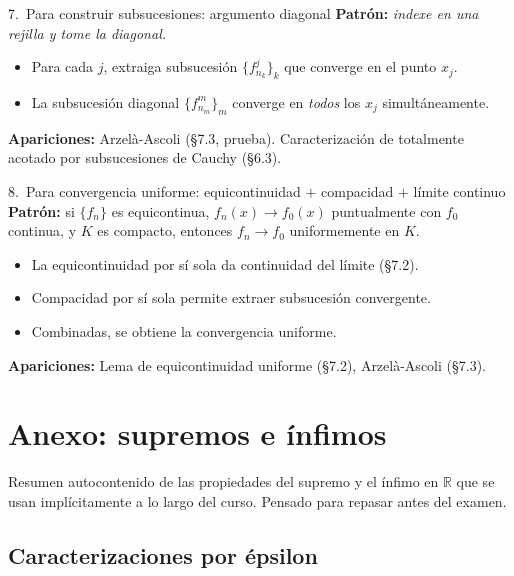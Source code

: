 \documentclass[11pt,twoside]{article}
\newcommand{\R}{\mathbb{R}}
\begin{document}
\begin{strategybox}{7.\ Para construir subsucesiones: argumento diagonal}
\textbf{Patrón:} \textit{indexe en una rejilla y tome la diagonal.}
\begin{itemize}[leftmargin=1.5em]
\item Para cada $j$, extraiga subsucesión $\{f_{n_{k}}^{j}\}_{k}$ que converge en el punto $x_{j}$.
\item La subsucesión diagonal $\{f_{n_{m}}^{m}\}_{m}$ converge en \emph{todos} los $x_{j}$ simultáneamente.
\end{itemize}
\textbf{Apariciones:} Arzelà-Ascoli (§7.3, prueba). Caracterización de totalmente acotado por subsucesiones de Cauchy (§6.3).
\end{strategybox}

\begin{strategybox}{8.\ Para convergencia uniforme: equicontinuidad $+$ compacidad $+$ límite continuo}
\textbf{Patrón:} si $\{f_{n}\}$ es equicontinua, $f_{n}(x) \to f_{0}(x)$ puntualmente con $f_{0}$ continua, y $K$ es compacto, entonces $f_{n} \to f_{0}$ uniformemente en $K$.
\begin{itemize}[leftmargin=1.5em]
\item La equicontinuidad por sí sola da continuidad del límite (§7.2).
\item Compacidad por sí sola permite extraer subsucesión convergente.
\item Combinadas, se obtiene la convergencia uniforme.
\end{itemize}
\textbf{Apariciones:} Lema de equicontinuidad uniforme (§7.2), Arzelà-Ascoli (§7.3).
\end{strategybox}

\newpage
\section{Anexo: supremos e ínfimos}

Resumen autocontenido de las propiedades del supremo y el ínfimo en \(\R\) que se usan implícitamente a lo largo del curso. Pensado para repasar antes del examen.

\subsection{Caracterizaciones por épsilon}
\end{document}
